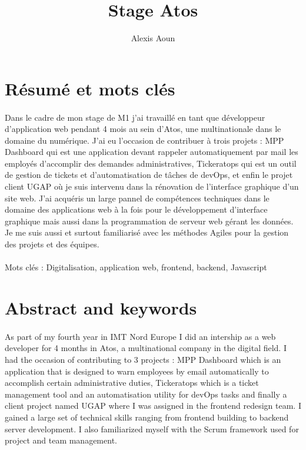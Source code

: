 \documentclass[12pt]{article}
\author {Alexis Aoun}
\begin{document}
\begin {sloppypar}
\title {Stage Atos}
\date {}
\maketitle
\newpage

\def\contentsname{Sommaires}
\tableofcontents
\newpage

\renewcommand{\listfigurename}{Table des matières des illustrations}
\listoffigures
\newpage

\section*{Résumé et mots clés}
\paragraph{}
Dans le cadre de mon stage de M1 j'ai travaillé en tant que développeur d'application 
web pendant 4 mois au sein d'Atos, une multinationale dans le domaine du numérique. 
J'ai eu l'occasion de contribuer à trois projets : MPP Dashboard qui est une application 
devant rappeler automatiquement par mail les employés d'accomplir des demandes administratives, 
Tickeratops qui est un outil de gestion de tickets et d'automatisation de tâches de devOps, et enfin 
le projet client UGAP où je suis intervenu dans la rénovation de l'interface graphique d'un site web. 
J'ai acquéris un large pannel de compétences techniques dans le domaine des applications web à la fois 
pour le développement d'interface graphique mais aussi dans la programmation de serveur web gérant les données.
Je me suis aussi et surtout familiarisé avec les méthodes Agiles pour la gestion des projets et des équipes.
\paragraph{}
Mots clés : Digitalisation, application web, frontend, backend, Javascript
\newpage

\section*{Abstract and keywords}
\paragraph{}
As part of my fourth year in IMT Nord Europe I did an intership as a web developer for 4 months 
in Atos, a multinational company in the digital field. I had the occasion of contributing to 3 projects : 
MPP Dashboard which is an application that is designed to warn employees by email automatically to accomplish certain 
administrative duties, Tickeratops which is a ticket management tool and an automatisation utility for devOps tasks and 
finally a client project named UGAP where I was assigned in the frontend redesign team. I gained a large set of technical 
skills ranging from frontend building to backend server development. I also familiarized myself 
with the Scrum framework used for project and team management.

\end{sloppypar}
\end{document}
